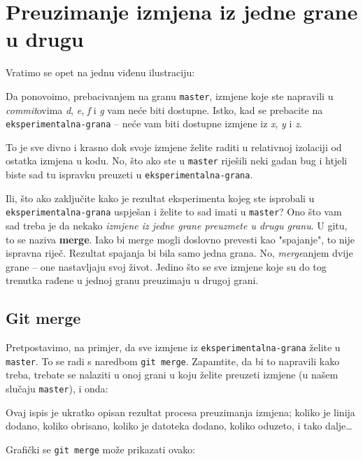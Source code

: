 \chapter*{Preuzimanje izmjena iz jedne grane u drugu}

Vratimo se opet na jednu viđenu ilustraciju:



Da ponovoimo, prebacivanjem na granu \verb+master+, izmjene koje ste napravili u \emph{commit}ovima \emph d, \emph e, \emph f i \emph g vam neće biti dostupne.
Istko, kad se prebacite na \verb+eksperimentalna-grana+ -- neće vam biti dostupne izmjene iz \emph x, \emph y i \emph z.

To je sve divno i krasno dok svoje izmjene želite raditi u relativnoj izolaciji od ostatka izmjena u kodu. 
No, što ako ste u \verb+master+ riješili neki gadan bug i htjeli biste sad tu ispravku preuzeti u \verb+eksperimentalna-grana+.

Ili, što ako zaključite kako je rezultat eksperimenta kojeg ste isprobali u \verb+eksperimentalna-grana+ uspješan i želite to sad imati u \verb+master+?
Ono što vam sad treba je da nekako \emph{izmjene iz jedne grane preuzmete u drugu granu}.
U gitu, to se naziva \textbf{merge}.
Iako bi merge mogli doslovno prevesti kao "spajanje", to nije ispravna riječ. 
Rezultat spajanja bi bila samo jedna grana. 
No, \emph{merge}anjem dvije grane -- one nastavljaju svoj život. 
Jedino što se sve izmjene koje su do tog trenutka rađene u jednoj granu preuzimaju u drugoj grani.

\section*{Git merge}

Pretpostavimo, na primjer, da sve izmjene iz \verb+eksperimentalna-grana+ želite u \verb+master+. 
To se radi s naredbom \verb+git merge+.
Zapamtite, da bi to napravili kako treba, trebate se nalaziti u onoj grani u koju želite preuzeti izmjene (u našem slučaju \verb+master+), i onda:



Ovaj ispis je ukratko opisan rezultat procesa preuzimanja izmjena; koliko je linija dodano, koliko obrisano, koliko je datoteka dodano, koliko oduzeto, i tako dalje\dots

Grafički se \verb+git merge+ može prikazati ovako:

